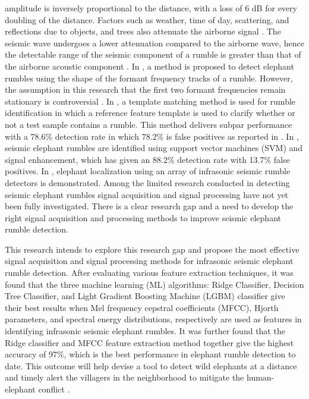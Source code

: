 \documentclass[applsci,article,accept,moreauthors,pdftex]{Definitions/mdpi}
\begin{document}
amplitude is inversely proportional to the distance, with a loss of 6 dB for every doubling of the distance. Factors such as weather, time of day, scattering, and reflections due to objects, and trees also attenuate the airborne signal \cite{o2000seismic}. The seismic wave undergoes a lower attenuation compared to the airborne wave, hence the detectable range of the seismic component of a rumble is greater than that of the airborne acoustic component \cite{sayakkara2017eloc}. In \cite{wijayakulasooriya}, a method is proposed to detect elephant rumbles using the shape of the formant frequency tracks of a rumble. However, the assumption in this research that the first two formant frequencies remain stationary is controversial \cite{zeppelzauer2015towards}. In \cite{Hao}, a template matching method is used for rumble identification in which a reference feature template is used to clarify whether or not a test sample contains a rumble. This method delivers subpar performance with a 78.6\% detection rate in which 78.2\% is false positives as reported in \cite{zeppelzauer2015}. In \cite{zeppelzauer2015}, seismic elephant rumbles are identified using support vector machines (SVM) and signal enhancement, which has given an 88.2\% detection rate with 13.7\% false positives. In  \cite{Reinwald2021}, elephant localization using an array of infrasonic seismic rumble detectors is demonstrated. Among the limited research conducted in detecting seismic elephant rumbles signal acquisition and signal processing have not yet been fully investigated. There is a clear research gap and a need to develop the right signal acquisition and processing methods to improve seismic elephant rumble detection.\par
This research intends to explore this research gap and propose the most effective signal acquisition and signal processing methods for infrasonic seismic elephant rumble detection. After evaluating various feature extraction techniques, it was found that the three machine learning (ML) algorithms: Ridge Classifier, Decision Tree Classifier, and Light Gradient Boosting Machine (LGBM) classifier give their best results when Mel frequency cepstral coefficients (MFCC), Hjorth parameters, and spectral energy distributions, respectively are used as features in identifying infrasonic seismic elephant rumbles. It was further found that the Ridge classifier and MFCC feature extraction method together give the highest accuracy of 97\%, which is the best performance in elephant rumble detection to date. This outcome will help devise a tool to detect wild elephants at a distance and timely alert the villagers in the neighborhood to mitigate the human-elephant conflict \cite{prakash}.
\end{document}

